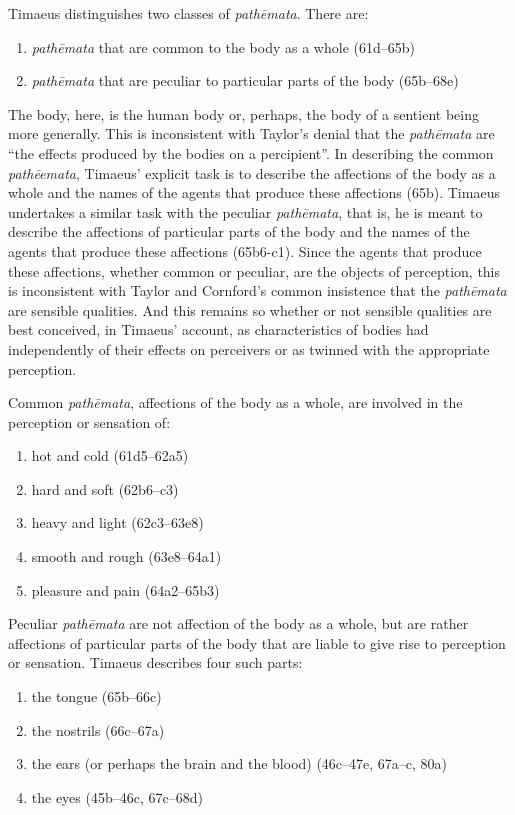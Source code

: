 Timaeus distinguishes two classes of \emph{pathēmata}. There are:
\begin{enumerate}
	\item \emph{pathēmata} that are common to the body as a whole (61d--65b)
	\item \emph{pathēmata} that are peculiar to particular parts of the body (65b--68e)
\end{enumerate}
The body, here, is the human body or, perhaps, the body of a sentient being more generally. This is inconsistent with Taylor's \citeyearpar[431]{Taylor:1928qb} denial that the \emph{pathēmata} are ``the effects produced by the bodies on a percipient''. In describing the common \emph{pathēemata}, Timaeus' explicit task is to describe the affections of the body as a whole and the names of the agents that produce these affections (65b). Timaeus undertakes a similar task with the peculiar \emph{pathēmata}, that is, he is meant to describe the affections of particular parts of the body and the names of the agents that produce these affections (65b6-c1). Since the agents that produce these affections, whether common or peculiar, are the objects of perception, this is inconsistent with Taylor and Cornford's common insistence that the \emph{pathēmata} are sensible qualities. And this remains so whether or not sensible qualities are best conceived, in Timaeus' account, as characteristics of bodies had independently of their effects on perceivers or as twinned with the appropriate perception. 

Common \emph{pathēmata}, affections of the body as a whole, are involved in the perception or sensation of:
\begin{enumerate}
 	\item hot and cold (61d5--62a5)
 	\item hard and soft (62b6--c3)
 	\item heavy and light (62c3--63e8)
 	\item smooth and rough (63e8--64a1)
 	\item pleasure and pain (64a2--65b3)
\end{enumerate}

Peculiar \emph{pathēmata} are not affection of the body as a whole, but are rather affections of particular parts of the body that are liable to give rise to perception or sensation. Timaeus describes four such parts:
\begin{enumerate}
	\item the tongue (65b--66c)
	\item the nostrils (66c--67a)
	\item the ears (or perhaps the brain and the blood) (46c--47e, 67a--c, 80a)
	\item the eyes (45b--46c, 67c--68d)
\end{enumerate}
	
